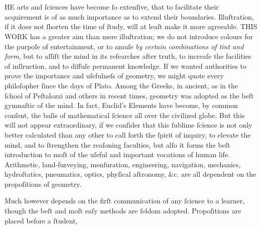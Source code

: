\begin{minipage}{0.80\textwidth}
    \section[Introduction]{}
    \label{sec:intro}

    \hfill

    \lettrine[lines=3, loversize=1, nindent=0pt]{}{}HE arts and ſciences have become ſo extenſive, that to facilitate their acquirement is of as much importance as to extend their boundaries. Illuſtration, if it does not ſhorten the time of ſtudy, will at leaſt make it more agreeable. T\textsc{HIS WORK} has a greater aim than mere illuſtration; we do not introduce colours for the purpoſe of entertainment, or to amuſe \textit{by certain combinations of tint and form}, but to aſſiſt the mind in its reſearches after truth, to increaſe the facilities of inſlruction, and to diffuſe permanent knowledge. If we wanted authorities to prove the importance and uſefulneſs of geometry, we might quote every philoſopher ſince the days of Plato. Among the Greeks, in ancient, as in the ſchool of Peſtalozzi and others in recent times, geometry was adopted as the beſt gymnaſtic of the mind. In fact, Euclid’s Elements have become, by common conſent, the baſis of mathematical ſcience all over the civilized globe. But this will not appear extraordinary, if we conſider that this ſublime ſcience is not only better calculated than any other to call forth the ſpirit of inquiry, to elevate the mind, and to ſtrengthen the reaſoning faculties, but alſo it forms the beſt introduction to moſt of the uſeful and important vocations of human life.  Arithmetic, land-ſurveying, menſuration, engineering, navigation, mechanics, hydroſtatics, pneumatics, optics, phyſical aſtronomy, \&c. are all dependent on the propoſitions of geometry.

    \hfill

    Much however depends on the firſt communication of any ſcience to a learner, though the beſt and moſt eaſy methods are ſeldom adopted.  Propoſitions are placed before a ſtudent,
\end{minipage}

\newpage

